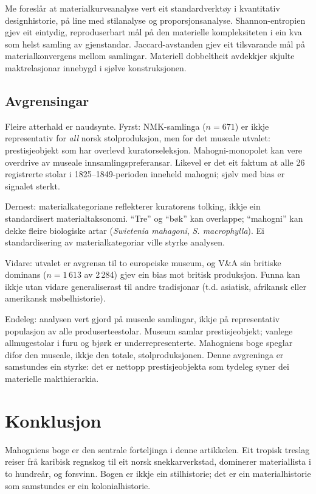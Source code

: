 \documentclass[10pt, a4paper, twocolumn]{article}
\begin{document}
Me foreslår at materialkurveanalyse vert eit standardverktøy i kvantitativ designhistorie, på line med stilanalyse og proporsjonsanalyse. Shannon-entropien gjev eit eintydig, reproduserbart mål på den materielle kompleksiteten i ein kva som helst samling av gjenstandar. Jaccard-avstanden gjev eit tilsvarande mål på materialkonvergens mellom samlingar. Materiell dobbeltheit avdekkjer skjulte maktrelasjonar innebygd i sjølve konstruksjonen.

\subsection{Avgrensingar}

Fleire atterhald er naudsynte. Fyrst: NMK-samlinga ($n = 671$) er ikkje representativ for \emph{all} norsk stolproduksjon, men for det museale utvalet: prestisjeobjekt som har overlevd kuratorseleksjon. Mahogni-monopolet kan vere overdrive av museale innsamlingspreferansar. Likevel er det eit faktum at alle 26 registrerte stolar i 1825--1849-perioden inneheld mahogni; sjølv med bias er signalet sterkt.

Dernest: materialkategoriane reflekterer kuratorens tolking, ikkje ein standardisert materialtaksonomi. ``Tre'' og ``bøk'' kan overlappe; ``mahogni'' kan dekke fleire biologiske artar (\emph{Swietenia mahagoni}, \emph{S. macrophylla}). Ei standardisering av materialkategoriar ville styrke analysen.

Vidare: utvalet er avgrensa til to europeiske museum, og V\&A sin britiske dominans ($n = 1\,613$ av 2\,284) gjev ein bias mot britisk produksjon. Funna kan ikkje utan vidare generaliserast til andre tradisjonar (t.d. asiatisk, afrikansk eller amerikansk møbelhistorie).

Endeleg: analysen vert gjord på museale samlingar, ikkje på representativ populasjon av alle produserteestolar. Museum samlar prestisjeobjekt; vanlege allmugestolar i furu og bjørk er underrepresenterte. Mahogniens boge speglar difor den museale, ikkje den totale, stolproduksjonen. Denne avgreninga er samstundes ein styrke: det er nettopp prestisjeobjekta som tydeleg syner dei materielle makthierarkia.


\section{Konklusjon}

Mahogniens boge er den sentrale forteljinga i denne artikkelen. Eit tropisk treslag reiser frå karibisk regnskog til eit norsk snekkarverkstad, dominerer materiallista i to hundreår, og forsvinn. Bogen er ikkje ein stilhistorie; det er ein materialhistorie som samstundes er ein kolonialhistorie.
\end{document}

